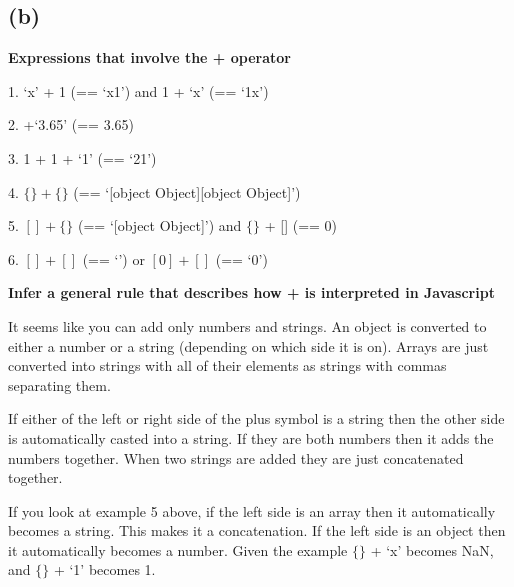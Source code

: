 \documentclass[11pt, oneside]{article}
\newcommand{\forceindent}{\leavevmode{\parindent=1.5em\indent}}
\begin{document}
\subsection*{(b)}
\forceindent \par \textbf{Expressions that involve the + operator}
\par 1. `x' + 1 (== `x1') and 1 + `x' (== `1x')
\par 2. +`3.65' (== 3.65)
\par 3. 1 + 1 + `1' (== `21')
\par 4. $\{\} + \{\}$ (== `[object Object][object Object]')
\par 5. $[] + \{\}$ (== `[object Object]') and $\{\}$ + [] (== 0)
\par 6. $[] + []$ (== `') or  $[0] + []$ (== `0')
\par \textbf{Infer a general rule that describes how + is interpreted in Javascript}
\par It seems like you can add only numbers and strings. An object is converted to either a number or a string (depending on which side it is on). Arrays are just converted into strings with all of their elements as strings with commas separating them. 
\par If either of the left or right side of the plus symbol is a string then the other side is automatically casted into a string. If they are both numbers then it adds the numbers together. When two strings are added they are just concatenated together. 
\par If you look at example 5 above, if the left side is an array then it automatically becomes a string. This makes it a concatenation. If the left side is an object then it automatically becomes a number. Given the example $\{\}$ + `x' becomes NaN, and $\{\}$ + `1' becomes 1.
\end{document}
